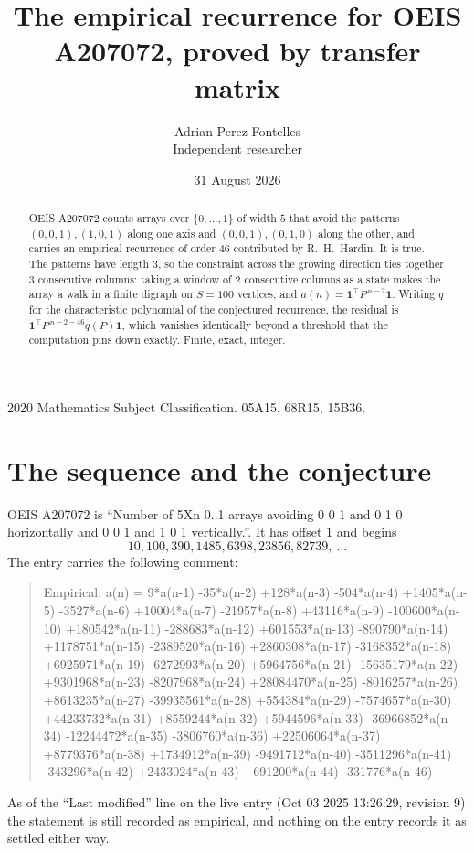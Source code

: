 \documentclass[11pt,a4paper]{article}
\title{The empirical recurrence for OEIS A207072, proved by transfer matrix}
\author{Adrian Perez Fontelles\\ \small Independent researcher}
\date{31 August 2026}
\theoremstyle{plain}
\theoremstyle{definition}
\begin{document}
\maketitle

\begin{abstract}
OEIS A207072 counts arrays over $\{0,\dots,1\}$ of width $5$ that avoid the patterns
$(0,0,1), (1,0,1)$ along one axis and $(0,0,1), (0,1,0)$ along the other, and carries an empirical recurrence of
order $46$ contributed by R.~H.~Hardin. It is true. The patterns have length $3$, so
the constraint across the growing direction ties together $3$ consecutive columns: taking a
window of $2$ consecutive columns as a state makes the array a walk in a finite digraph
on $S=100$ vertices, and $a(n)=\mathbf{1}^{\!\top}P^{\,n-2}\mathbf{1}$. Writing $q$
for the characteristic polynomial of the conjectured recurrence, the residual is
$\mathbf{1}^{\!\top}P^{\,n-2-46}q(P)\mathbf{1}$, which vanishes identically
beyond a threshold that the computation pins down exactly. Finite, exact, integer.
\end{abstract}

\noindent\small 2020 Mathematics Subject Classification. 05A15, 68R15, 15B36.\normalsize

\section{The sequence and the conjecture}

OEIS A207072 is ``Number of 5Xn 0..1 arrays avoiding 0 0 1 and 0 1 0 horizontally and 0 0 1 and 1 0 1 vertically.''. It has offset
$1$ and begins
\[
10, 100, 390, 1485, 6398, 23856, 82739,\ \dots
\]
The entry carries the following comment:
\begin{quote}\small
Empirical: a(n) = 9*a(n-1) -35*a(n-2) +128*a(n-3) -504*a(n-4) +1405*a(n-5) -3527*a(n-6) +10004*a(n-7) -21957*a(n-8) +43116*a(n-9) -100600*a(n-10) +180542*a(n-11) -288683*a(n-12) +601553*a(n-13) -890790*a(n-14) +1178751*a(n-15) -2389520*a(n-16) +2860308*a(n-17) -3168352*a(n-18) +6925971*a(n-19) -6272993*a(n-20) +5964756*a(n-21) -15635179*a(n-22) +9301968*a(n-23) -8207968*a(n-24) +28084470*a(n-25) -8016257*a(n-26) +8613235*a(n-27) -39935561*a(n-28) +554384*a(n-29) -7574657*a(n-30) +44233732*a(n-31) +8559244*a(n-32) +5944596*a(n-33) -36966852*a(n-34) -12244472*a(n-35) -3806760*a(n-36) +22506064*a(n-37) +8779376*a(n-38) +1734912*a(n-39) -9491712*a(n-40) -3511296*a(n-41) -343296*a(n-42) +2433024*a(n-43) +691200*a(n-44) -331776*a(n-46)
\end{quote}
As of the ``Last modified'' line on the live entry (Oct 03 2025 13:26:29, revision
9) the statement is still recorded as empirical, and nothing on the entry
records it as settled either way.
\end{document}
